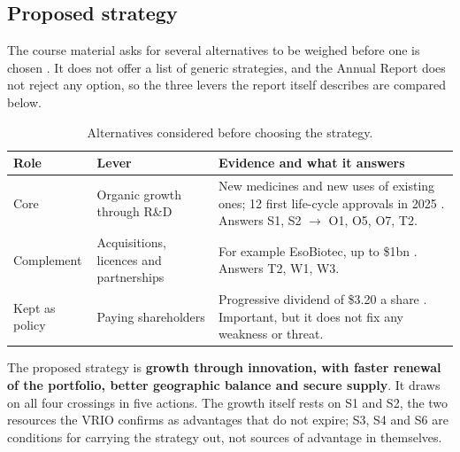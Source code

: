 \subsection{Proposed strategy}
The course material asks for several alternatives to be weighed before one is chosen \cite[pp.~3, 7, 29]{PLAN}. It does not offer a list of generic strategies, and the Annual Report does not reject any option, so the three levers the report itself describes are compared below.

\begin{table}[H]\centering
\caption{Alternatives considered before choosing the strategy.}
\label{tab:alternativas}
\begin{tabularx}{\linewidth}{@{}lp{3.5cm}Y@{}}
\toprule
\textbf{Role} & \textbf{Lever} & \textbf{Evidence and what it answers} \\
\midrule
Core & Organic growth through R\&D & New medicines and new uses of existing ones; 12 first life-cycle approvals in 2025 \cite[pp.~4, 52]{AR}. Answers S1, S2 $\rightarrow$ O1, O5, O7, T2. \\
\addlinespace
Complement & Acquisitions, licences and partnerships & For example EsoBiotec, up to \$1bn \cite[pp.~37, 48]{AR}. Answers T2, W1, W3. \\
\addlinespace
Kept as policy & Paying shareholders & Progressive dividend of \$3.20 a share \cite[pp.~3, 10]{AR}. Important, but it does not fix any weakness or threat. \\
\bottomrule
\end{tabularx}
\end{table}
The proposed strategy is \textbf{growth through innovation, with faster renewal of the portfolio, better geographic balance and secure supply}. It draws on all four crossings in five actions. The growth itself rests on S1 and S2, the two resources the VRIO confirms as advantages that do not expire; S3, S4 and S6 are conditions for carrying the strategy out, not sources of advantage in themselves.

